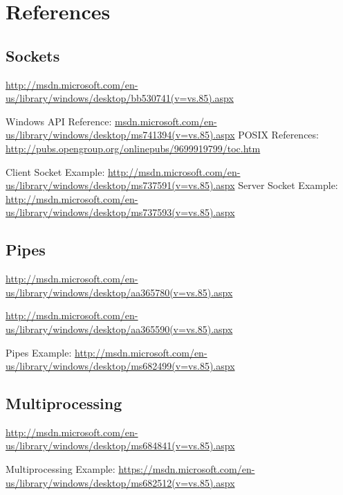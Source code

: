 \documentclass[letterpaper,10pt]{article}
\begin{document}
\newpage

\section{References}

\subsection{Sockets}
\url{http://msdn.microsoft.com/en-us/library/windows/desktop/bb530741(v=vs.85).aspx}

Windows API Reference: \url{msdn.microsoft.com/en-us/library/windows/desktop/ms741394(v=vs.85).aspx}
POSIX References: \url{http://pubs.opengroup.org/onlinepubs/9699919799/toc.htm}

Client Socket Example: \url{http://msdn.microsoft.com/en-us/library/windows/desktop/ms737591(v=vs.85).aspx}
Server Socket Example: \url{http://msdn.microsoft.com/en-us/library/windows/desktop/ms737593(v=vs.85).aspx}

\subsection{Pipes}
\url{http://msdn.microsoft.com/en-us/library/windows/desktop/aa365780(v=vs.85).aspx}

\url{http://msdn.microsoft.com/en-us/library/windows/desktop/aa365590(v=vs.85).aspx}

Pipes Example: \url{http://msdn.microsoft.com/en-us/library/windows/desktop/ms682499(v=vs.85).aspx}

\subsection{Multiprocessing}
\url{http://msdn.microsoft.com/en-us/library/windows/desktop/ms684841(v=vs.85).aspx}

Multiprocessing Example: \url{https://msdn.microsoft.com/en-us/library/windows/desktop/ms682512(v=vs.85).aspx}
\end{document}
